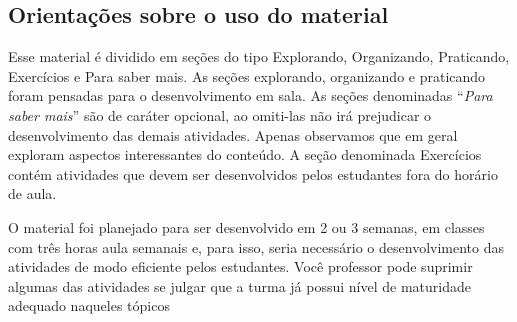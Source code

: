 \begin{apresentacao}
\section*{Orientações sobre o uso do material}

Esse material é dividido em seções do tipo Explorando, Organizando, Praticando, Exercícios e Para saber mais. As seções explorando, organizando e praticando foram pensadas para o desenvolvimento em sala. As seções denominadas “\textit{Para saber mais}” são de caráter opcional, ao omiti-las não irá prejudicar o desenvolvimento das demais atividades. Apenas observamos que em geral  exploram aspectos interessantes do conteúdo. A seção denominada Exercícios contém atividades que devem ser desenvolvidos pelos estudantes fora do horário de aula. 

O material foi planejado para ser desenvolvido em 2 ou 3 semanas, em classes com três horas aula semanais e, para isso, seria necessário o desenvolvimento das atividades de modo eficiente pelos estudantes. Você  professor pode suprimir  algumas das atividades se julgar que a turma já possui nível de maturidade adequado naqueles tópicos


\end{apresentacao}

